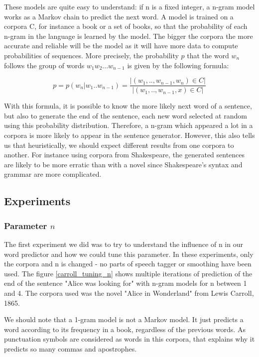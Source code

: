 \documentclass[a4paper,12pt]{article}
\begin{document}
These models are quite easy to understand: if n is a fixed integer, a n-gram model works as a Markov chain to predict the next word. A model is trained on a corpora C, for instance a book or a set of books, so that the probability of each n-gram in the language is learned by the model. The bigger the corpora the more accurate and reliable will be the model as it will have more data to compute probabilities of sequences. More precisely, the probability $p$ that the word $w_n$ follows the group of words $w_1 w_2 ... w_{n-1}$ is given by the following formula:

$$ p = p(w_n | w_1 .. w_{n-1}) = \frac{|{(w_1, .., w_{n-1}, w_n) \in C}|}{|{(w_1, .., w_{n-1}, x) \in C}|} $$

With this formula, it is possible to know the more likely next word of a sentence, but also to generate the end of the sentence, each new word selected at random using this probability distribution. Therefore, a n-gram which appeared a lot in a corpora is more likely to appear in the sentence generator. However, this also tells us that heuristically, we should expect different results from one corpora to another. For instance using corpora from Shakespeare, the generated sentences are likely to be more erratic than with a novel since Shakespeare's syntax and grammar are more complicated.

\subsection{Experiments}
\subsubsection{Parameter $n$}
	The first experiment we did was to try to understand the influence of n in our word predictor and how we could tune this parameter. In these experiments, only the corpora and n is changed - no parts of speech tagger or smoothing have been used. The figure \ref{carroll_tuning_n} shows multiple iterations of prediction of the end of the sentence "Alice was looking for" with n-gram models for n between 1 and 4. The corpora used was the novel "Alice in Wonderland" from Lewis Carroll, 1865. 
	
We should note that a 1-gram model is not a Markov model. It just predicts a word according to its frequency in a book, regardless of the previous words. As punctuation symbols are considered as words in this corpora, that explains why it predicts so many commas and apostrophes. 
\end{document}
